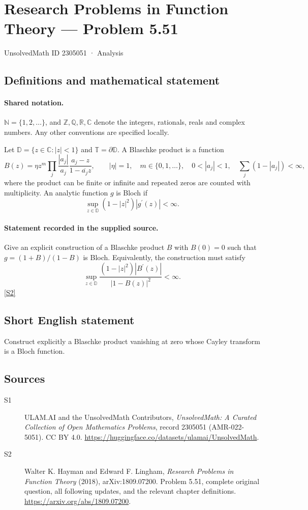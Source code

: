 \documentclass[11pt]{book}
\newcommand{\sref}[2]{\hyperlink{source:#1:#2}{[S#2]}}
\begin{document}
\setcounter{section}{2305050}
\section{Research Problems in Function Theory — Problem 5.51}\label{2305051}
{\small\sffamily UnsolvedMath ID 2305051 · Analysis}
\subsection{Definitions and mathematical statement}

\paragraph{Shared notation.}$\mathbb N=\{1,2,\ldots\}$, and $\mathbb Z,\mathbb Q,\mathbb R,\mathbb C$ denote the integers, rationals, reals and complex numbers. Any other conventions are specified locally.


Let $\mathbb D=\{z\in\mathbb C:|z|<1\}$ and $\mathbb T=\partial\mathbb D$. A Blaschke product is a function \[B(z)=\eta z^m\prod_j\frac{|a_j|}{a_j}\frac{a_j-z}{1-\overline{a_j}z},\qquad |\eta|=1,\quad m\in\{0,1,\ldots\},\quad 0<|a_j|<1,\quad\sum_j(1-|a_j|)<\infty,\] where the product can be finite or infinite and repeated zeros are counted with multiplicity. An analytic function $g$ is Bloch if \[\sup_{z\in\mathbb D}(1-|z|^2)|g^{\prime}(z)|<\infty.\]
\paragraph{Statement recorded in the supplied source.}
Give an explicit construction of a Blaschke product $B$ with $B(0)=0$ such that $g=(1+B)/(1-B)$ is Bloch. Equivalently, the construction must satisfy \[\sup_{z\in\mathbb D}\frac{(1-|z|^2)|B^{\prime}(z)|}{|1-B(z)|^2}<\infty.\] \sref{2305051}{2}
\subsection{Short English statement}
Construct explicitly a Blaschke product vanishing at zero whose Cayley transform is a Bloch function.
\subsection{Sources}
\begin{description}
\item[\hypertarget{source:2305051:1}{S1}] ULAM.AI and the UnsolvedMath Contributors, \emph{UnsolvedMath: A Curated Collection of Open Mathematics Problems}, record 2305051 (AMR-022-5051). CC BY 4.0. \url{https://huggingface.co/datasets/ulamai/UnsolvedMath}.
\item[\hypertarget{source:2305051:2}{S2}] Walter K. Hayman and Edward F. Lingham, \emph{Research Problems in Function Theory} (2018), arXiv:1809.07200. Problem 5.51, complete original question, all following updates, and the relevant chapter definitions. \url{https://arxiv.org/abs/1809.07200}.
\end{description}
\label{end:2305051}
\end{document}
